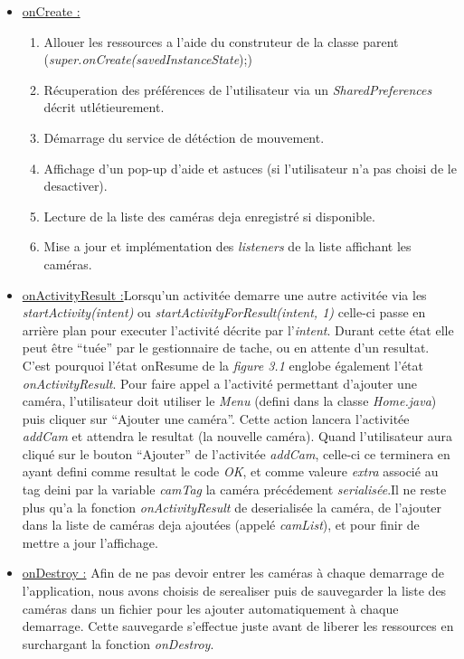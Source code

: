 \begin{itemize}
  \item   \underline{onCreate :} \begin{enumerate}
    \item Allouer les ressources a l'aide du construteur de la classe parent
    (\textit{super.onCreate(savedInstanceState});)
    \item Récuperation des préférences de l'utilisateur via un
    \textit{SharedPreferences} décrit utlétieurement.
    \item Démarrage du service de détéction de mouvement.
    \item Affichage d'un pop-up d'aide et astuces (si l'utilisateur n'a pas
    choisi de le desactiver).
    \item Lecture de la liste des caméras deja enregistré si disponible.
    \item Mise a jour et implémentation des \textit{listeners} de la liste
    affichant les caméras.\newline
  \end{enumerate} 
  \item \underline{ onActivityResult :}\newline Lorsqu'un activitée demarre une
  autre activitée via les \textit{startActivity(intent)} ou
  \textit{startActivityForResult(intent, 1)} celle-ci passe en arrière plan pour
  executer l'activité décrite par l'\textit{intent}. Durant cette état elle peut
  être ``tuée'' par le gestionnaire de tache, ou en attente d'un resultat. C'est pourquoi l'état
  onResume de la \textit{figure 3.1} englobe également l'état
  \textit{onActivityResult}.\newline
  Pour faire appel a l'activité permettant d'ajouter une caméra, l'utilisateur
  doit utiliser le \textit{Menu} (defini dans la classe \textit{Home.java}) puis
  cliquer sur ``Ajouter une caméra''. Cette action lancera l'activitée
  \textit{addCam} et attendra le resultat (la nouvelle caméra).
  \newline Quand l'utilisateur aura cliqué sur le bouton ``Ajouter'' de
  l'activitée \textit{addCam}, celle-ci ce terminera en ayant defini comme
  resultat le code \textit{OK}, et comme valeure \textit{extra} associé au tag
  deini par la variable\textit{ camTag} la caméra
  précédement \textit{serialisée}.\newline Il ne reste plus qu'a la fonction
  \textit{onActivityResult} de deserialisée la caméra, de l'ajouter dans la
  liste de caméras deja ajoutées (appelé \textit{camList}), et pour finir de
  mettre a jour l'affichage.\newline
  
  \item \underline{onDestroy :}\newline
  Afin de ne pas devoir entrer les caméras à chaque demarrage de
  l'application, nous avons choisis de serealiser puis de sauvegarder la liste
  des caméras dans un fichier pour les ajouter automatiquement à chaque
  demarrage. Cette sauvegarde s'effectue juste avant de liberer les ressources
  en surchargant la fonction \textit{onDestroy}. 
  \end{itemize}
  
